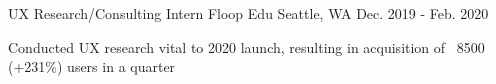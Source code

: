 \begin{cventries}
  \cventry
    {UX Research/Consulting Intern} %
    {Floop Edu} %
    {Seattle, WA} %
    {Dec. 2019 - Feb. 2020} %
    {
      \begin{cvitems} %
        \item {Conducted UX research vital to 2020 launch, resulting in acquisition of ~8500 (+231\%) users in a quarter}
      \end{cvitems}
    }

\end{cventries}